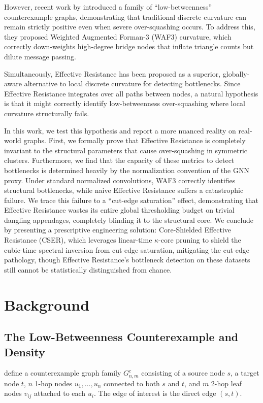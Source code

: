 \documentclass[10pt]{article} %
\begin{document}
However, recent work by \citet{Chen2026} introduced a family of ``low-betweenness'' counterexample graphs, demonstrating that traditional discrete curvature can remain strictly positive even when severe over-squashing occurs. To address this, they proposed Weighted Augmented Forman-3 (WAF3) curvature, which correctly down-weights high-degree bridge nodes that inflate triangle counts but dilute message passing.

Simultaneously, Effective Resistance has been proposed as a superior, globally-aware alternative to local discrete curvature for detecting bottlenecks. Since Effective Resistance integrates over all paths between nodes, a natural hypothesis is that it might correctly identify low-betweenness over-squashing where local curvature structurally fails.

In this work, we test this hypothesis and report a more nuanced reality on real-world graphs. First, we formally prove that Effective Resistance is completely invariant to the structural parameters that cause over-squashing in symmetric clusters. Furthermore, we find that the capacity of these metrics to detect bottlenecks is determined heavily by the normalization convention of the GNN proxy. Under standard normalized convolutions, WAF3 correctly identifies structural bottlenecks, while naive Effective Resistance suffers a catastrophic failure. We trace this failure to a ``cut-edge saturation'' effect, demonstrating that Effective Resistance wastes its entire global thresholding budget on trivial dangling appendages, completely blinding it to the structural core. We conclude by presenting a prescriptive engineering solution: Core-Shielded Effective Resistance (CSER), which leverages linear-time $\kappa$-core pruning to shield the cubic-time spectral inversion from cut-edge saturation, mitigating the cut-edge pathology, though Effective Resistance's bottleneck detection on these datasets still cannot be statistically distinguished from chance.

\section{Background}
\subsection{The Low-Betweenness Counterexample and Density}
\citet{Chen2026} define a counterexample graph family $G^c_{n,m}$ consisting of a source node $s$, a target node $t$, $n$ 1-hop nodes $u_1, \dots, u_n$ connected to both $s$ and $t$, and $m$ 2-hop leaf nodes $v_{ij}$ attached to each $u_i$. The edge of interest is the direct edge $(s,t)$.
\end{document}
